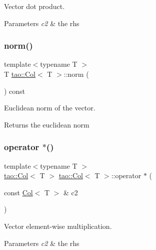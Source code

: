 Vector dot product. 


\begin{DoxyParams}{Parameters}
{\em c2} & the rhs \\
\hline
\end{DoxyParams}
\mbox{\label{classtao_1_1_col_a229cd5a26d1fa4424150329127ca31d5}} 
\subsubsection{\texorpdfstring{norm()}{norm()}}
{\footnotesize\ttfamily template$<$typename T $>$ \\
T \mbox{\hyperlink{classtao_1_1_col}{tao\+::\+Col}}$<$ T $>$\+::norm (\begin{DoxyParamCaption}{ }\end{DoxyParamCaption}) const}



Euclidean norm of the vector. 

\begin{DoxyReturn}{Returns}
the euclidean norm 
\end{DoxyReturn}
\mbox{\label{classtao_1_1_col_a661dd9512fad58cfbedfdf52ca6806fb}} 
\subsubsection{\texorpdfstring{operator $\ast$()}{operator *()}\hspace{0.1cm}{\footnotesize\ttfamily [1/2]}}
{\footnotesize\ttfamily template$<$typename T $>$ \\
\mbox{\hyperlink{classtao_1_1_col}{tao\+::\+Col}}$<$ T $>$ \mbox{\hyperlink{classtao_1_1_col}{tao\+::\+Col}}$<$ T $>$\+::operator $\ast$ (\begin{DoxyParamCaption}\item[{const \mbox{\hyperlink{classtao_1_1_col}{Col}}$<$ T $>$ \&}]{c2 }\end{DoxyParamCaption})}



Vector element-\/wise multiplication. 


\begin{DoxyParams}{Parameters}
{\em c2} & the rhs \\
\hline
\end{DoxyParams}
\mbox{\label{classtao_1_1_col_a734ed22497ede69a2ed0f791bd503355}} 
